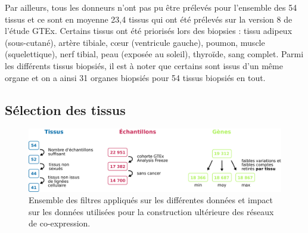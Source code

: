 Par ailleurs, tous les donneurs n'ont pas pu être prélevés pour l'ensemble des 54 tissus et ce sont en moyenne 23,4 tissus qui ont été prélevés sur la version 8 de l'étude GTEx. Certains tissus ont été priorisés lors des biopsies : tissu adipeux (sous-cutané), artère tibiale, cœur (ventricule gauche), poumon, muscle (squelettique), nerf tibial, peau (exposée au soleil), thyroïde, sang complet. Parmi les différents tissus biopsiés, il est à noter que certains sont issus d'un même organe et on a ainsi 31 organes biopsiés pour 54 tissus biopsiés en tout.



\subsection{Sélection des tissus}

\begin{figure}[h]
    \centering
    \includegraphics[width=1\textwidth]{img/chap2/chap2_filtre_donnees.pdf}
    \caption{Ensemble des filtres appliqués sur les différentes données et impact sur les données utilisées pour la construction ultérieure des réseaux de co-expression.}
    \label{figure:data_filters}
\end{figure}


